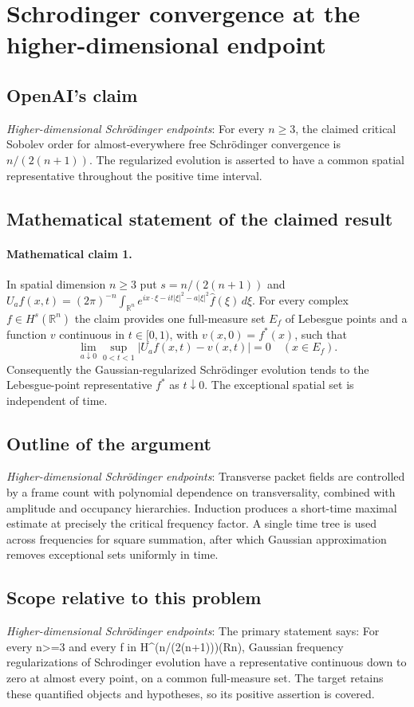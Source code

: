 \documentclass[11pt]{article}
\begin{document}
\section*{Schrodinger convergence at the higher-dimensional endpoint}

\subsection{OpenAI's claim}
\textit{Higher-dimensional Schrödinger endpoints}: For every $n\ge3$, the claimed critical Sobolev order for almost-everywhere free Schrödinger convergence is $n/(2(n+1))$. The regularized evolution is asserted to have a common spatial representative throughout the positive time interval.

\subsection{Mathematical statement of the claimed result}
\paragraph{Mathematical claim 1.} In spatial dimension $n\ge3$ put $s=n/(2(n+1))$ and $U_af(x,t)=(2\pi)^{-n}\int_{\mathbb R^n}e^{ix\cdot\xi-it|\xi|^2-a|\xi|^2}\widehat f(\xi)\,d\xi$. For every complex $f\in H^s(\mathbb R^n)$ the claim provides one full-measure set $E_f$ of Lebesgue points and a function $v$ continuous in $t\in[0,1)$, with $v(x,0)=f^*(x)$, such that \[\lim_{a\downarrow0}\sup_{0<t<1}|U_af(x,t)-v(x,t)|=0\quad(x\in E_f).\] Consequently the Gaussian-regularized Schr\"odinger evolution tends to the Lebesgue-point representative $f^*$ as $t\downarrow0$. The exceptional spatial set is independent of time.

\subsection{Outline of the argument}
\textit{Higher-dimensional Schrödinger endpoints}: Transverse packet fields are controlled by a frame count with polynomial dependence on transversality, combined with amplitude and occupancy hierarchies. Induction produces a short-time maximal estimate at precisely the critical frequency factor. A single time tree is used across frequencies for square summation, after which Gaussian approximation removes exceptional sets uniformly in time.

\subsection{Scope relative to this problem}
\textit{Higher-dimensional Schrödinger endpoints}: The primary statement says: For every n>=3 and every f in H\textasciicircum{}(n/(2(n+1)))(Rn), Gaussian frequency regularizations of Schrodinger evolution have a representative continuous down to zero at almost every point, on a common full-measure set. The target retains these quantified objects and hypotheses, so its positive assertion is covered.
\end{document}
